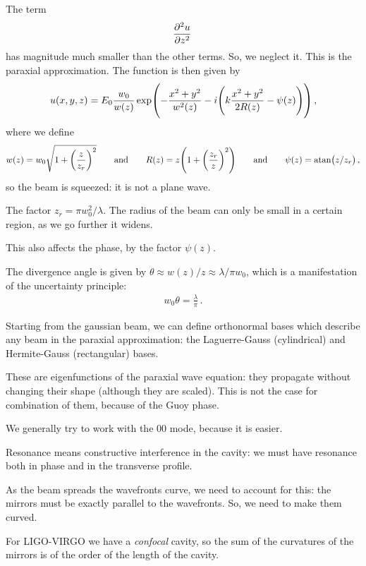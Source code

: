 \documentclass[main.tex]{subfiles}
\begin{document}
The term 
%
\begin{align}
\pdv[2]{u}{z}
\,
\end{align}
%
has magnitude much smaller than the other terms. So, we neglect it. 
This is the paraxial approximation. The function is then given by 
%
\begin{align}
u(x, y, z) = E_0 \frac{w_0 }{w(z)} \exp(-\frac{x^2 +y^2}{w^2(z)} -i \qty(k \frac{x^2+y^2}{2 R(z)} - \psi (z)))
\,,
\end{align}
%
where we define 
%
\begin{align}
w(z) = w_0 \sqrt{1 + \qty( \frac{z}{z_{r}})^2}
\qquad \text{and} \qquad
R(z) = z \qty(1 + \qty( \frac{z_{r}}{z})^2)
\qquad \text{and} \qquad
\psi (z) = \atan(z / z_r)
\,,
\end{align}
%
so the beam is squeezed: it is not a plane wave. 

The factor \(z_{r} = \pi w_0^2 / \lambda \). 
The radius of the beam can only be small in a certain region, as we go further it widens. 

This also affects the phase, by the factor \(\psi (z)\).

The divergence angle is given by \(\theta \approx w (z) / z \approx \lambda / \pi w_0 \), which is a manifestation of the uncertainty principle: 
%
\begin{align}
w_0 \theta = \frac{\lambda}{\pi }
\,.
\end{align}

Starting from the gaussian beam, we can define orthonormal bases which describe any beam in the paraxial approximation: the Laguerre-Gauss (cylindrical) and Hermite-Gauss (rectangular) bases.

These are eigenfunctions of the paraxial wave equation: they propagate without changing their shape (although they are scaled). This is not the case for combination of them, because of the Guoy phase.

We generally try to work with the 00 mode, because it is easier. 

Resonance means constructive interference in the cavity: we must have resonance both in phase and in the transverse profile. 

As the beam spreads the wavefronts curve, we need to account for this: the mirrors must be exactly parallel to the wavefronts. 
So, we need to make them curved. 

For LIGO-VIRGO we have a \emph{confocal} cavity, so the sum of the curvatures of the mirrors is of the order of the length of the cavity. 
\end{document}
